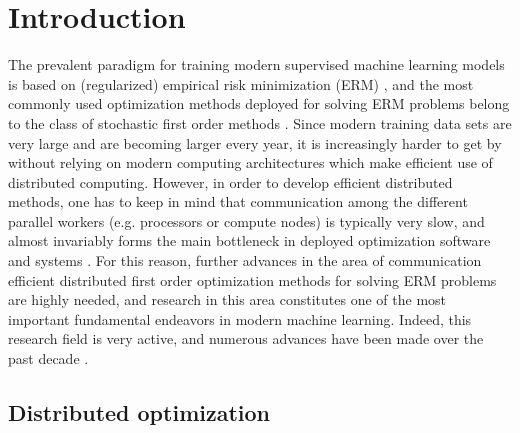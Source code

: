 \documentclass[12pt]{article}
\begin{document}
\section{Introduction}
	The prevalent paradigm for training modern supervised machine learning models is based on (regularized) empirical risk minimization (ERM) \citep{shai_book}, and the most commonly used optimization methods deployed for solving ERM problems belong to the class of  stochastic first order methods \citep{RobbinsMonro:1951,  Nemirovski-Juditsky-Lan-Shapiro-2009}. Since modern training data sets are very large and are becoming larger every year, it is increasingly harder to get by without relying on modern computing architectures which make efficient use of  distributed computing.  However, in order to develop efficient distributed methods, one has to keep in mind that communication among the different parallel workers (e.g. processors or compute nodes) is typically very slow, and almost invariably forms the main bottleneck in deployed optimization software and systems \citep{bekkerman2011scaling}. For this reason, further advances in the area of communication efficient distributed first order optimization methods for solving ERM problems are highly needed, and research in this area constitutes one  of the most important fundamental endeavors in modern machine learning. Indeed, this research  field is very active, and numerous advances  have been made over the past decade \citep{Seide14, Wen17, Alistarh17, Bernstein18, DIANA, Stich19, Tang19}.
 
  \subsection{Distributed optimization}
 
\end{document}
